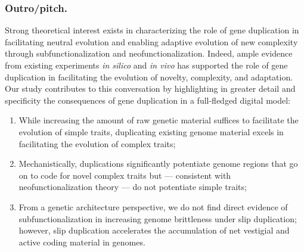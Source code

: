 \subsubsection{Outro/pitch.}
Strong theoretical interest exists in characterizing the role of gene duplication in facilitating neutral evolution and enabling adaptive evolution of new complexity through subfunctionalization and neofunctionalization.
Indeed, ample evidence from existing experiments \textit{in silico} and \textit{in vivo} has supported the role of gene duplication in facilitating the evolution of novelty, complexity, and adaptation.
Our study contributes to this conversation by highlighting in greater detail and specificity the consequences of gene duplication in a full-fledged digital model:
\begin{enumerate}
\item While increasing the amount of raw genetic material suffices to facilitate the evolution of simple traits, duplicating existing genome material excels in facilitating the evolution of complex traits;
\item Mechanistically, duplications significantly potentiate genome regions that go on to code for novel complex traits but --- consistent with neofunctionalization theory --- do not potentiate simple traits;
\item From a genetic architecture perspective, we do not find direct evidence of subfunctionalization in increasing genome brittleness under slip duplication; however, slip duplication accelerates the accumulation of net vestigial and active coding material in genomes.
\end{enumerate}


